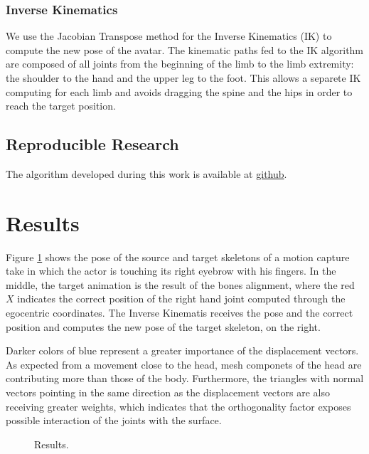\documentclass{vgtc}
\begin{document}
\subsubsection{Inverse Kinematics}\label{inverse-kinematics}

We use the Jacobian Transpose method for the Inverse Kinematics (IK) to
compute the new pose of the avatar\cite{buss}. The kinematic paths fed
to the IK algorithm are composed of all joints from the beginning of the
limb to the limb extremity: the shoulder to the hand and the upper leg
to the foot. This allows a separete IK computing for each limb and
avoids dragging the spine and the hips in order to reach the target
position.

\subsection{Reproducible Research}\label{reproducible-research}

The algorithm developed during this work is available at
\href{https://github.com/rltonoli/MotionRetargeting/}{github}.

    \section{Results}\label{results}

Figure \ref{fig:result1} shows the pose of the source and target
skeletons of a motion capture take in which the actor is touching its
right eyebrow with his fingers. In the middle, the target animation is
the result of the bones alignment, where the red \(X\) indicates the
correct position of the right hand joint computed through the egocentric
coordinates. The Inverse Kinematis receives the pose and the correct
position and computes the new pose of the target skeleton, on the right.

Darker colors of blue represent a greater importance of the displacement
vectors. As expected from a movement close to the head, mesh componets
of the head are contributing more than those of the body. Furthermore,
the triangles with normal vectors pointing in the same direction as the
displacement vectors are also receiving greater weights, which indicates
that the orthogonality factor exposes possible interaction of the joints
with the surface.


    \captionsetup{labelformat=default}
    \begin{figure}
        \begin{center}\end{center}
        \caption{Results.}
        \label{fig:result1}
    \end{figure}
    
\end{document}

